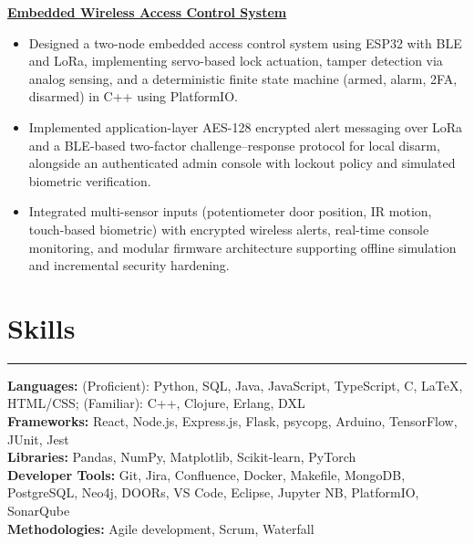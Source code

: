 \documentclass[10pt]{article}
\begin{document}
\href{https://github.com/Extinctable/SOEN-422-Project}{\textbf{Embedded Wireless Access Control System}}
\vspace{-4mm}
\begin{itemize}[left=0.15in, itemsep=1pt, label=--]
    \item Designed a two-node embedded access control system using ESP32 with BLE and LoRa, implementing servo-based lock actuation, tamper detection via analog sensing, and a deterministic finite state machine (armed, alarm, 2FA, disarmed) in C++ using PlatformIO.
    \item Implemented application-layer AES-128 encrypted alert messaging over LoRa and a BLE-based two-factor challenge--response protocol for local disarm, alongside an authenticated admin console with lockout policy and simulated biometric verification.
    \item Integrated multi-sensor inputs (potentiometer door position, IR motion, touch-based biometric) with encrypted wireless alerts, real-time console monitoring, and modular firmware architecture supporting offline simulation and incremental security hardening.
\end{itemize}

\vspace{-6mm} %
\section*{Skills}
\vspace{-2mm}
\hrule
\vspace{0mm}
\textbf{Languages:} (Proficient): Python, SQL, Java, JavaScript, TypeScript, C, LaTeX, HTML/CSS; (Familiar): C++, Clojure, Erlang, DXL \\
\textbf{Frameworks:} React, Node.js, Express.js, Flask, psycopg, Arduino, TensorFlow, JUnit, Jest \\
\textbf{Libraries:} Pandas, NumPy, Matplotlib, Scikit-learn, PyTorch \\
\textbf{Developer Tools:} Git, Jira, Confluence, Docker, Makefile, MongoDB, PostgreSQL, Neo4j, DOORs, VS Code, Eclipse, Jupyter NB, PlatformIO, SonarQube \\
\textbf{Methodologies:} Agile development, Scrum, Waterfall
\end{document}
